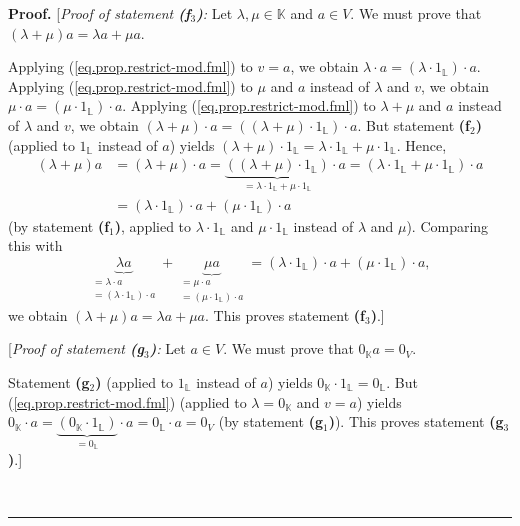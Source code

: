 \documentclass[numbers=enddot,12pt,final,onecolumn,notitlepage]{scrartcl}%
\theoremstyle{definition}
\newenvironment{fineprint}{\begin{small}}{\end{small}}
\newenvironment{proof}[1][Proof]{\noindent\textbf{#1.} }{\ \rule{0.5em}{0.5em}}
\begin{document}
\begin{fineprint}
\begin{proof}
[\textit{Proof of statement \textbf{(f}}$_{3}$\textit{\textbf{)}:} Let
$\lambda,\mu\in\mathbb{K}$ and $a\in V$. We must prove that $\left(
\lambda+\mu\right)  a=\lambda a+\mu a$.

Applying (\ref{eq.prop.restrict-mod.fml}) to $v=a$, we obtain $\lambda\cdot
a=\left(  \lambda\cdot1_{\mathbb{L}}\right)  \cdot a$. Applying
(\ref{eq.prop.restrict-mod.fml}) to $\mu$ and $a$ instead of $\lambda$ and
$v$, we obtain $\mu\cdot a=\left(  \mu\cdot1_{\mathbb{L}}\right)  \cdot a$.
Applying (\ref{eq.prop.restrict-mod.fml}) to $\lambda+\mu$ and $a$ instead of
$\lambda$ and $v$, we obtain $\left(  \lambda+\mu\right)  \cdot a=\left(
\left(  \lambda+\mu\right)  \cdot1_{\mathbb{L}}\right)  \cdot a$. But
statement \textbf{(f}$_{2}$\textbf{)} (applied to $1_{\mathbb{L}}$ instead of
$a$) yields $\left(  \lambda+\mu\right)  \cdot1_{\mathbb{L}}=\lambda
\cdot1_{\mathbb{L}}+\mu\cdot1_{\mathbb{L}}$. Hence,%
\begin{align*}
\left(  \lambda+\mu\right)  a  &  =\left(  \lambda+\mu\right)  \cdot
a=\underbrace{\left(  \left(  \lambda+\mu\right)  \cdot1_{\mathbb{L}}\right)
}_{=\lambda\cdot1_{\mathbb{L}}+\mu\cdot1_{\mathbb{L}}}\cdot a=\left(
\lambda\cdot1_{\mathbb{L}}+\mu\cdot1_{\mathbb{L}}\right)  \cdot a\\
&  =\left(  \lambda\cdot1_{\mathbb{L}}\right)  \cdot a+\left(  \mu
\cdot1_{\mathbb{L}}\right)  \cdot a
\end{align*}
(by statement \textbf{(f}$_{1}$\textbf{)}, applied to $\lambda\cdot
1_{\mathbb{L}}$ and $\mu\cdot1_{\mathbb{L}}$ instead of $\lambda$ and $\mu$).
Comparing this with%
\[
\underbrace{\lambda a}_{\substack{=\lambda\cdot a\\=\left(  \lambda
\cdot1_{\mathbb{L}}\right)  \cdot a}}+\underbrace{\mu a}_{\substack{=\mu\cdot
a\\=\left(  \mu\cdot1_{\mathbb{L}}\right)  \cdot a}}=\left(  \lambda
\cdot1_{\mathbb{L}}\right)  \cdot a+\left(  \mu\cdot1_{\mathbb{L}}\right)
\cdot a,
\]
we obtain $\left(  \lambda+\mu\right)  a=\lambda a+\mu a$. This proves
statement \textbf{(f}$_{3}$\textbf{)}.]

[\textit{Proof of statement \textbf{(g}}$_{3}$\textit{\textbf{)}:} Let $a\in
V$. We must prove that $0_{\mathbb{K}}a=0_{V}$.

Statement \textbf{(g}$_{2}$\textbf{)} (applied to $1_{\mathbb{L}}$ instead of
$a$) yields $0_{\mathbb{K}}\cdot1_{\mathbb{L}}=0_{\mathbb{L}}$. But
(\ref{eq.prop.restrict-mod.fml}) (applied to $\lambda=0_{\mathbb{K}}$ and
$v=a$) yields $0_{\mathbb{K}}\cdot a=\underbrace{\left(  0_{\mathbb{K}}%
\cdot1_{\mathbb{L}}\right)  }_{=0_{\mathbb{L}}}\cdot a=0_{\mathbb{L}}\cdot
a=0_{V}$ (by statement \textbf{(g}$_{1}$\textbf{)}). This proves statement
\textbf{(g}$_{3}$\textbf{)}.]


\end{proof}
\end{fineprint}
\end{document}
